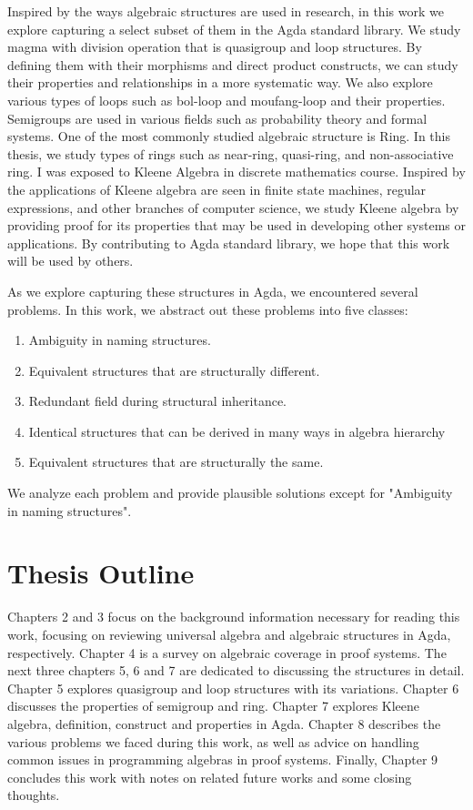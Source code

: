 Inspired by the ways algebraic structures are used in research, in this work we
explore capturing a select subset of them in the Agda standard library. We study
magma with division operation that is quasigroup and loop structures. By
defining them with their morphisms and direct product constructs, we can study
their properties and relationships in a more systematic way. We also explore
various types of loops such as bol-loop and moufang-loop and their properties.
Semigroups are used in various fields such as probability theory and formal
systems. One of the most commonly studied algebraic structure is Ring. In this
thesis, we study types of rings such as near-ring, quasi-ring, and
non-associative ring. I was exposed to Kleene Algebra in discrete mathematics
course. Inspired by the applications of Kleene algebra are seen in finite state
machines, regular expressions, and other branches of computer science, we study
Kleene algebra by providing proof for its properties that may be used in
developing other systems or applications. By contributing to Agda standard
library, we hope that this work will be used by others. 

As we explore capturing these structures in Agda, we encountered several
problems. In this work, we abstract out these problems into five classes:
\begin{enumerate}
\item Ambiguity in naming structures.
\item Equivalent structures that are structurally different.
\item Redundant field during structural inheritance.
\item Identical structures that can be derived in many ways in algebra hierarchy
\item Equivalent structures that are structurally the same.
\end{enumerate}
We analyze each problem and provide plausible solutions except for "Ambiguity in naming structures".

\section{Thesis Outline}
Chapters 2 and 3 focus on the background information necessary for reading this
work, focusing on reviewing universal algebra and algebraic structures in Agda,
respectively. Chapter 4 is a survey on algebraic coverage in proof systems. The
next three chapters 5, 6 and 7 are dedicated to discussing the structures in
detail. Chapter 5 explores quasigroup and loop structures with its variations.
Chapter 6 discusses the properties of semigroup and ring. Chapter 7 explores
Kleene algebra, definition, construct and properties in Agda. Chapter 8
describes the various problems we faced during this work, as well as advice on
handling common issues in programming algebras in proof systems. Finally,
Chapter 9 concludes this work with notes on related future works and some
closing thoughts.
